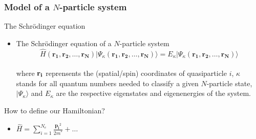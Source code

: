 \documentclass[xcolor=pdftex,hyperref={pdfpagelabels=false},table]{beamer}
\begin{document}
\begin{frame}
\frametitle{Model of a $N$-particle system}
\small
\begin{block}{The Schr\"odinger equation}
\begin{itemize}
\item The Schr\"odinger equation of a $N$-particle system
\begin{equation}
\hat{H}(\mathbf{r_1},\mathbf{r_2},\dots,\mathbf{r_N}) | \Psi_\kappa (\mathbf{r_1},\mathbf{r_2},\dots,\mathbf{r_N}) \rangle=E_\kappa | \Psi_\kappa (\mathbf{r_1},\mathbf{r_2},\dots,\mathbf{r_N}) \rangle
\end{equation} 
 \\ where $\bf{r_i}$ reprensents the (spatial/spin) coordinates of quasiparticle $i$, $\kappa$ stands for all quantum numbers needed to classify a given $N$-particle state, \newline $ | \Psi_\kappa \rangle$ and $E_\kappa$ are the respective eigenstates and eigenenergies of the system.
\end{itemize}
  \end{block}
\begin{alertblock}{How to define our Hamiltonian?}
\begin{itemize}
\item $\hat{H}= \sum_{i=1}^{N_e} \frac{\mathbf{p_i}^2}{2m^*} +\dots$
\end{itemize}
  \end{alertblock}
\end{frame}
\end{document}
